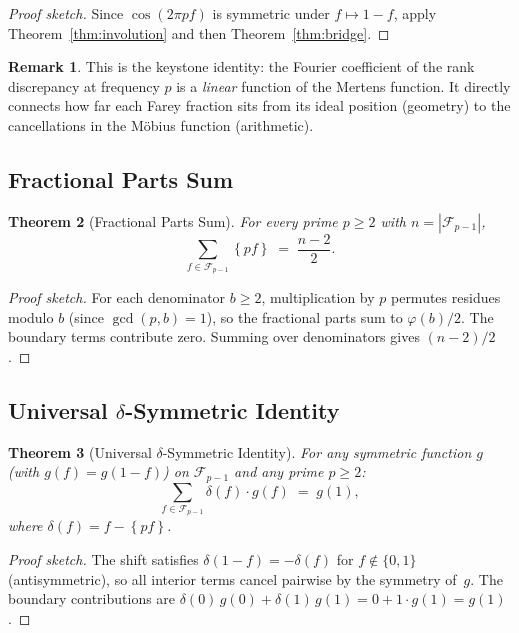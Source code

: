 \documentclass[11pt]{article}
\newtheorem{theorem}{Theorem}[section]
\theoremstyle{definition}
\newtheorem{remark}[theorem]{Remark}
\newcommand{\F}{\mathcal{F}}
\newcommand{\fpart}[1]{\left\{#1\right\}}
\begin{document}
\begin{proof}[Proof sketch]
Since $\cos(2\pi pf)$ is symmetric under $f \mapsto 1-f$,
apply Theorem~\ref{thm:involution} and then Theorem~\ref{thm:bridge}.
\end{proof}

\begin{remark}
This is the keystone identity: the Fourier coefficient of the
rank discrepancy at frequency $p$ is a \emph{linear} function
of the Mertens function.  It directly connects how far each
Farey fraction sits from its ideal position (geometry) to the
cancellations in the M\"obius function (arithmetic).
\end{remark}

\subsection{Fractional Parts Sum}

\begin{theorem}[Fractional Parts Sum]\label{thm:frac-parts}
For every prime $p \ge 2$ with $n = |\F_{p-1}|$,
\begin{equation}\label{eq:frac-parts}
  \sum_{f \in \F_{p-1}} \fpart{pf} \;=\; \frac{n-2}{2}.
\end{equation}
\end{theorem}

\begin{proof}[Proof sketch]
For each denominator $b \ge 2$, multiplication by $p$ permutes
residues modulo $b$ (since $\gcd(p,b) = 1$), so the fractional
parts sum to $\varphi(b)/2$.  The boundary terms contribute zero.
Summing over denominators gives $(n - 2)/2$.
\end{proof}

\subsection{Universal $\delta$-Symmetric Identity}

\begin{theorem}[Universal $\delta$-Symmetric Identity]\label{thm:delta-sym}
For any symmetric function $g$ (with $g(f) = g(1-f)$) on $\F_{p-1}$
and any prime $p \ge 2$:
\begin{equation}\label{eq:delta-sym}
  \sum_{f \in \F_{p-1}} \delta(f) \cdot g(f) \;=\; g(1),
\end{equation}
where $\delta(f) = f - \fpart{pf}$.
\end{theorem}

\begin{proof}[Proof sketch]
The shift satisfies $\delta(1-f) = -\delta(f)$ for
$f \notin \{0,1\}$ (antisymmetric), so all interior terms
cancel pairwise by the symmetry of~$g$.  The boundary
contributions are $\delta(0)\,g(0) + \delta(1)\,g(1) =
0 + 1 \cdot g(1) = g(1)$.
\end{proof}
\end{document}
